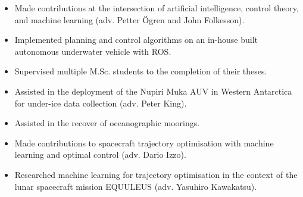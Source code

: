 \documentclass[10pt,a4paper,ragged2e,withhyper]{altacv}
\begin{document}
\begin{paracol}{2}


\begin{itemize}
\item Made contributions at the intersection of artificial intelligence, control theory, and machine learning (adv. Petter \"Ogren and John Folkesson).
\item Implemented planning and control algorithms on an in-house built autonomous underwater vehicle with ROS.
\item Supervised multiple M.Sc. students to the completion of their theses.
\end{itemize}

\divider

\begin{itemize}
\item Assisted in the deployment of the Nupiri Muka AUV in Western Antarctica
for under-ice data collection (adv. Peter King).
\item Assisted in the recover of oceanographic moorings. 
\end{itemize}

\divider

\begin{itemize}
  \item Made contributions to spacecraft trajectory optimisation with machine learning and optimal control (adv. Dario Izzo).
\end{itemize}

\divider

\begin{itemize}
  \item Researched machine learning for trajectory optimisation in the context of the lunar spacecraft mission EQUULEUS (adv. Yasuhiro Kawakatsu).
\end{itemize}



\end{paracol}
\end{document}
